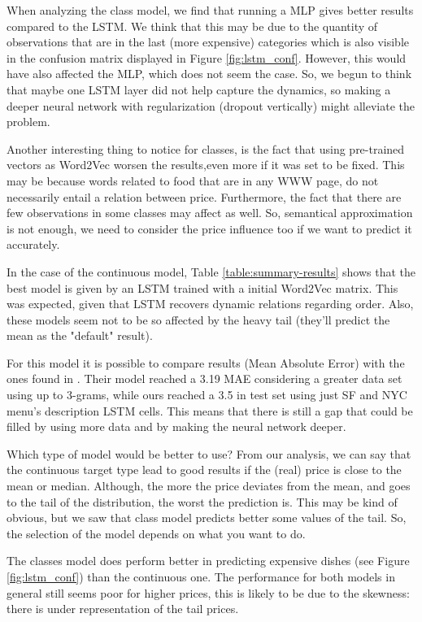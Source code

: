 \documentclass[11pt,letterpaper]{article}
\begin{document}
When analyzing the class model, we find that running a MLP gives better results compared to the LSTM. We think that this may be due to the quantity of observations that are in the last (more expensive) categories which is also visible in the confusion matrix displayed in Figure \ref{fig:lstm_conf}. However, this would have also affected the MLP, which does not seem the case. So, we begun to think that maybe one LSTM layer did not help capture the dynamics, so making a deeper neural network with regularization (dropout vertically) might alleviate the problem. 

Another interesting thing to notice for classes, is the fact that using pre-trained vectors as Word2Vec worsen the results,even more if it was set to be fixed. This may be because words related to food that are in any WWW page, do not necessarily entail a relation between price. Furthermore, the fact that there are few observations in some classes may affect as well. So, semantical approximation is not enough, we need to consider the price influence too if we want to predict it accurately.


In the case of the continuous model, Table \ref{table:summary-results} shows that the best model is given by an LSTM trained with a initial Word2Vec matrix. This was expected, given that LSTM recovers dynamic relations regarding order. Also, these models seem not to be so affected by the heavy tail (they'll predict the mean as the "default" result).


For this model it is possible to compare results (Mean Absolute Error) with the ones found in \cite{chahuneau2012word}. Their model reached a 3.19  MAE considering a greater data set using up to 3-grams, while ours reached a 3.5 in test set using just SF and NYC menu's description LSTM cells. This means that there is still a gap that could be filled by using more data and by making the neural network deeper.



Which type of model would be better to use? From our analysis, we can say that the continuous target type lead to good results if the (real) price is close to the mean or median. Although, the more the price deviates from the mean, and goes to the tail of the distribution, the worst the prediction is. This may be kind of obvious, but we saw that class model predicts better some values of the tail. So, the selection of the model depends on what you want to do.

The classes model does perform better in predicting expensive dishes (see Figure \ref{fig:lstm_conf}) than the continuous one. The performance for both models in general still seems poor for higher prices, this is likely to be due to the skewness: there is under representation of the tail prices.
\end{document}
